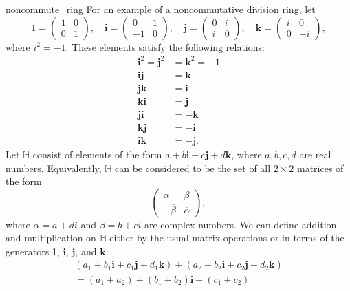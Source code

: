  
\begin{example}{noncommute_ring}
For an example of a noncommutative division ring, let
\[
1 = 
\begin{pmatrix}
1 & 0 \\
0 & 1
\end{pmatrix},
\quad
{\mathbf i}
=
\begin{pmatrix}
0 & 1 \\
-1 & 0
\end{pmatrix},
\quad
{\mathbf j} =
\begin{pmatrix}
0 & i \\
i & 0
\end{pmatrix},
\quad
{\mathbf k} = 
\begin{pmatrix}
i & 0 \\
0 & -i
\end{pmatrix},
\]
where $i^2 = -1$. These elements satisfy the following relations: 
\begin{align*}
{\mathbf i}^2 = {\mathbf j}^2 & =  {\mathbf k}^2 = -1 \\
{\mathbf i}  {\mathbf j} & =  {\mathbf k}  \\
{\mathbf j}  {\mathbf k} & =  {\mathbf i}  \\
{\mathbf k}  {\mathbf i} & =  {\mathbf j}  \\
{\mathbf j}  {\mathbf i} & =  - {\mathbf k}  \\
{\mathbf k}  {\mathbf j} & =  - {\mathbf i}  \\
{\mathbf i}  {\mathbf k} & =  - {\mathbf j}. 
\end{align*}
Let ${\mathbb H}$\label{noteringH} consist of elements of the form $a + b
{\mathbf i}  + c {\mathbf j} +d {\mathbf k}$, where $a, b , c, d$ are real
numbers. Equivalently, ${\mathbb H}$ can be considered to be the set of
all $2 \times 2$ matrices of the form  
\[
\begin{pmatrix}
\alpha & \beta \\
-\overline{\beta} & \overline{\alpha }
\end{pmatrix},
\]
where $\alpha = a + di$ and $\beta = b+ci$ are complex numbers. We can
define addition and multiplication on ${\mathbb H}$ either by the usual matrix
operations or in terms of the generators 1, ${\mathbf i}$, ${\mathbf j}$,
and ${\mathbf k}$: 
\begin{multline*}
(a_1 + b_1 {\mathbf i}  + c_1 {\mathbf j} +d_1 {\mathbf k} )
+ ( a_2 + b_2 {\mathbf i}  + c_2 {\mathbf j} +d_2 {\mathbf k} ) \\
=
(a_1 + a_2) + ( b_1 + b_2) {\mathbf i}  + ( c_1 + c_2)

\end{multline*}
\end{example}
